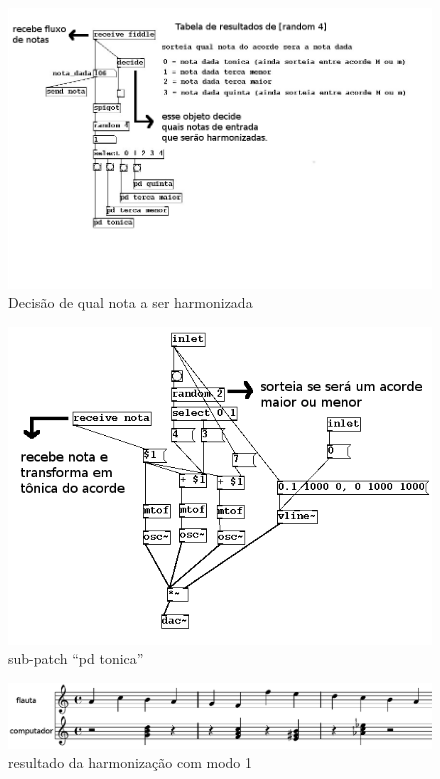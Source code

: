 \documentclass{ppgmus}
\begin{document}
\begin{figure}
\includegraphics[scale=.6]{harm1}
\caption{Decisão de qual nota a ser harmonizada}
\label{harm1}
\end{figure}

\begin{figure}
\includegraphics[scale=.6]{harm2}
\caption{sub-patch ``pd tonica''}
\label{harm2}
\end{figure}

\begin{figure}
\includegraphics[scale=.4]{harm3}
\caption{resultado da harmonização com modo 1}
\label{harm3}
\end{figure}
\end{document}
